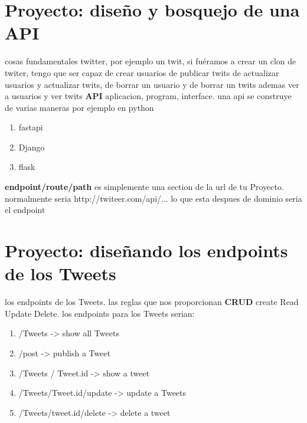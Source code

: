 \documentclass{article}
\begin{document}
    \section{Proyecto: diseño y bosquejo de una API}
    
    cosas fundamentales twitter, por ejemplo un twit, si fuéramos a crear un clon de twiter, tengo que ser capaz de crear usuarios de publicar twits de actualizar usuarios y actualizar twits, de borrar un usuario y de borrar un twits ademas ver a usuarios y ver twits 
    \textbf{API} aplicacion, program, interface. 
    una api se construye de varias maneras 
    por ejemplo en python \begin{enumerate}
        \item fastapi
        \item Django
        \item flask
    \end{enumerate}
    \textbf{endpoint/route/path} es simplemente una section de la url de tu Proyecto.
    normalmente seria http://twiteer.com/api/... lo que esta despues de dominio seria el endpoint
    \section{Proyecto: diseñando los endpoints de los Tweets}
    los endpoints de los Tweets. las reglas que nos proporcionan
    \textbf{CRUD} create Read Update Delete. 
    los endpoints para los Tweets serian:
    \begin{enumerate}
        \item /Tweets -> show all Tweets
        \item /post -> publish a Tweet
        \item /Tweets / {Tweet.id} -> show a tweet
        \item /Tweets/{Tweet.id}/update -> update a Tweets
        \item /Tweets/{tweet.id}/delete -> delete a tweet
    \end{enumerate}
\end{document}
